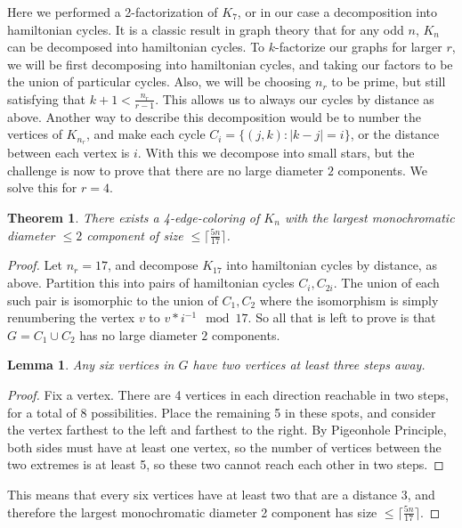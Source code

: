 \documentclass{article}
\newtheorem{theorem}{Theorem}
\newtheorem{lemma}{Lemma}
\begin{document}
	Here we performed a 2-factorization of $ K_7 $, or in our case a decomposition into hamiltonian cycles. It is a classic result in graph theory that for any odd $ n $, $ K_n $ can be decomposed into hamiltonian cycles. To $ k $-factorize our graphs for larger $ r $, we will be first decomposing into hamiltonian cycles, and taking our factors to be the union of particular cycles. Also, we will be choosing $ n_r $ to be prime, but still satisfying that $ k+1< \frac{n_r}{r-1} $. This allows us to always our cycles by distance as above. Another way to describe this decomposition would be to number the vertices of $ K_{n_r} $, and make each cycle $ C_i=\{(j,k) : |k-j|=i\} $, or the distance between each vertex is $ i $. With this we decompose into small stars, but the challenge is now to prove that there are no large diameter $ 2 $ components. We solve this for $ r=4 $.
	\begin{theorem}
		There exists a 4-edge-coloring of $ K_n $ with the largest monochromatic diameter $ \le 2 $ component of size $ \le \lceil \frac{5n}{17} \rceil $.
	\end{theorem}

	\begin{proof}
		Let $ n_r=17 $, and decompose $ K_{17} $ into hamiltonian cycles by distance, as above. Partition this into pairs of hamiltonian cycles $ C_i,C_{2i} $. The union of each such pair is isomorphic to the union of $ C_1,C_2 $ where the isomorphism is simply renumbering the vertex $ v $ to $ v*i^{-1} \mod 17 $. So all that is left to prove is that $ G=C_1\cup C_2 $ has no large diameter $ 2 $ components.
		\begin{lemma}
			Any six vertices in $ G $ have two vertices at least three steps away.
		\end{lemma}
		\begin{proof}
			Fix a vertex. There are 4 vertices in each direction reachable in two steps, for a total of 8 possibilities. Place the remaining 5 in these spots, and consider the vertex farthest to the left and farthest to the right. By Pigeonhole Principle, both sides must have at least one vertex, so the number of vertices between the two extremes is at least 5, so these two cannot reach each other in two steps.
		\end{proof}
	This means that every six vertices have at least two that are a distance $ 3 $, and therefore the largest monochromatic diameter 2 component has size $ \le \lceil \frac{5n}{17} \rceil $.
	\end{proof}
\end{document}
